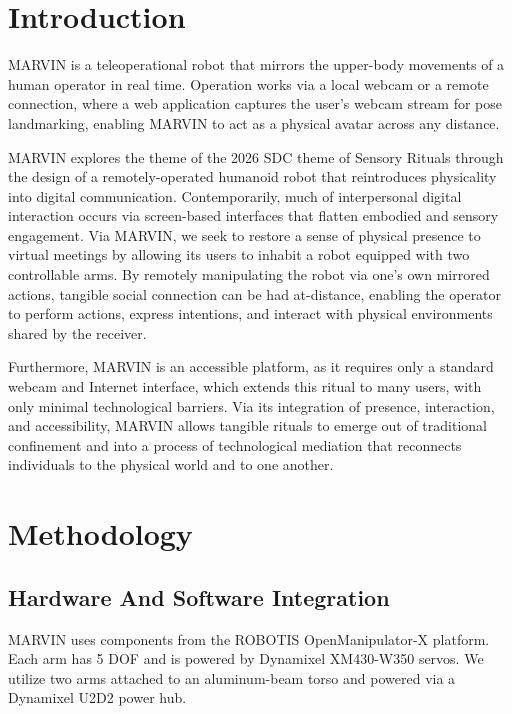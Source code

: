\documentclass[acmsmall, screen]{acmart}
\begin{document}


\maketitle

\section{Introduction}
MARVIN is a teleoperational robot that mirrors the upper-body movements of a human operator in real time. Operation works via a local webcam or a remote connection, where a web application captures the user's webcam stream for pose landmarking, enabling MARVIN to act as a physical avatar across any distance.

MARVIN explores the theme of the 2026 SDC theme of Sensory Rituals through the design of a remotely-operated humanoid robot that reintroduces physicality into digital communication. Contemporarily, much of interpersonal digital interaction occurs via screen-based interfaces that flatten embodied and sensory engagement. Via MARVIN, we seek to restore a sense of physical presence to virtual meetings by allowing its users to inhabit a robot equipped with two controllable arms. By remotely manipulating the robot via one's own mirrored actions, tangible social connection can be had at-distance, enabling the operator to perform actions, express intentions, and interact with physical environments shared by the receiver.

Furthermore, MARVIN is an accessible platform, as it requires only a standard webcam and Internet interface, which extends this ritual to many users, with only minimal technological barriers. Via its integration of presence, interaction, and accessibility, MARVIN allows tangible rituals to emerge out of traditional confinement and into a process of technological mediation that reconnects individuals to the physical world and to one another.

\section{Methodology}
\subsection{Hardware And Software Integration}
MARVIN uses components from the ROBOTIS OpenManipulator-X platform. Each arm has 5 DOF and is powered by Dynamixel XM430-W350 servos. We utilize two arms attached to an aluminum-beam torso and powered via a Dynamixel U2D2 power hub.
\end{document}

